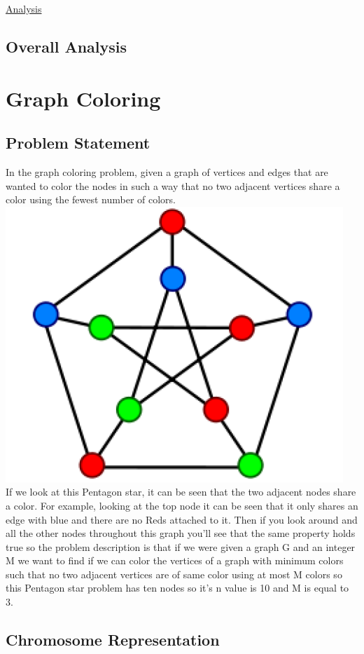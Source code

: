 \documentclass[11pt, letterpaper]{article}
\begin{document}
\underline{Analysis}
\subsection {Overall Analysis}

\section{Graph Coloring}
\subsection {Problem Statement}
In the graph coloring problem, given a graph of vertices and edges that are wanted to color the
nodes in such a way that no two adjacent vertices share a color using the fewest number of colors.
\includegraphics[scale=0.8]{images/graphCol.PNG}\\[1cm]
If we look at this Pentagon star, it can be seen that the two adjacent nodes share a color. For 
example, looking at the top node it can be seen that it only shares an edge with blue and there 
are no Reds attached to it. Then if you look around and all the other nodes throughout this graph 
you'll see that the same property holds true so the problem description is that if we were given a 
graph G and an integer M we want to find if we can color the vertices of a graph with minimum 
colors such that no two adjacent vertices are of same color using at most M colors so this Pentagon 
star problem has ten nodes so it's n value is 10 and M is equal to 3.\\
\subsection {Chromosome Representation}
\end{document}
